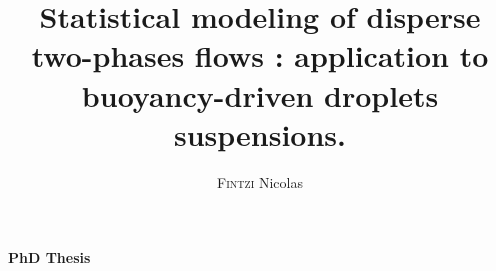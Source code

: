 \makeatletter
\begin{titlepage}

\begin{table}[h!]
\begin{minipage}[h]{0.5\linewidth}
\end{minipage}
\hspace{1cm}
\begin{minipage}[h]{0.5\linewidth}
\end{minipage}
\end{table}

\vfill

\begin{center}
{\Large\textbf{PhD Thesis}}\\

\vspace{3em}
\vspace{10pt}
\title{Statistical modeling of disperse two-phases flows : application to buoyancy-driven droplets suspensions.}
{\huge\textbf{\@title}} \\
\vspace{10pt}


\vspace{2em}
\author{\textsc{Fintzi} Nicolas}
{\LARGE \@author}

\vspace{3em}
{\large\textbf{\@date}}\\
\end{center}


\vfill


\vspace{1em}


\end{titlepage}
